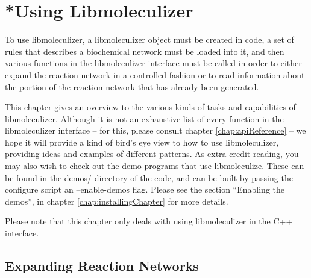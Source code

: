 \chapter{*Using Libmoleculizer}
\label{chap:usingLibmoleculizerChapter}

To use libmoleculizer, a libmoleculizer object must be created in
code, a set of rules that describes a biochemical network must be
loaded into it, and then various functions in the libmoleculizer
interface must be called in order to either expand the reaction
network in a controlled fashion or to read information about the
portion of the reaction network that has already been generated.  

This chapter gives an overview to the various kinds of tasks and
capabilities of libmoleculizer.  Although it is not an exhaustive list
of every function in the libmoleculizer interface -- for this, please
consult chapter \ref{chap:apiReference} -- we hope it will provide a
kind of bird's eye view to how to use libmoleculizer, providing ideas
and examples of different patterns.  As extra-credit reading, you may
also wish to check out the demo programs that use libmoleculize.
These can be found in the demos/ directory of the code, and can be
built by passing the configure script an --enable-demos flag.  Please
see the section ``Enabling the demos'', in chapter
\ref{chap:installingChapter} for more details. 

Please note that this chapter only deals with using libmoleculizer in
the C++ interface.  

\section{Expanding Reaction Networks}



